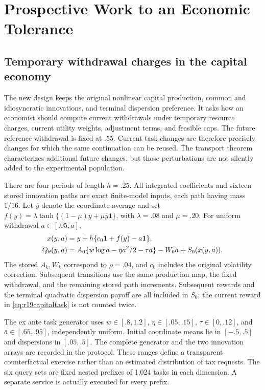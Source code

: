 \section{Prospective Work to an Economic Tolerance}\label{sec:r19experiment}
\subsection{Temporary withdrawal charges in the capital economy}
The new design keeps the original nonlinear capital production, common and
idiosyncratic innovations, and terminal dispersion preference. It asks how
an economist should compute current withdrawals under temporary resource
charges, current utility weights, adjustment terms, and feasible caps. The
future reference withdrawal is fixed at $.55$. Current task changes are
therefore precisely changes for which the same continuation can be reused.
The transport theorem characterizes additional future changes, but those
perturbations are not silently added to the experimental population.

There are four periods of length $h=.25$. All integrated coefficients and
sixteen stored innovation paths are exact finite-model inputs, each path
having mass $1/16$. Let $\overline y$ denote the coordinate average and set
$f(y)=\lambda\tanh\{(1-\mu)y+\mu\overline y\bm1\}$, with
$\lambda=.08$ and $\mu=.20$. For uniform withdrawal $a\in[.05,\bar a]$,
\begin{align}
 x(y,a)&=y+h\{c_0\bm1+f(y)-a\bm1\},\notag\\
 Q_\theta(y,a)&=A_0\{w\log a-\eta a^2/2-\tau a\}-W_0a
                    +S_0(x(y,a)).\label{eq:r19capitaltask}
\end{align}
The stored $A_k,W_k$ correspond to $\rho=.04$, and $c_0$ includes the
original volatility correction. Subsequent transitions use the same
production map, the fixed withdrawal, and the remaining stored path
increments. Subsequent rewards and the terminal quadratic dispersion payoff
are all included in $S_0$; the current reward in
\eqref{eq:r19capitaltask} is not counted twice.

The ex ante task generator uses $w\in[.8,1.2]$, $\eta\in[.05,.15]$,
$\tau\in[0,.12]$, and $\bar a\in[.65,.95]$, independently uniform.
Initial coordinate means lie in $[-.5,.5]$ and dispersions in $[.05,.5]$.
The complete generator and the two innovation arrays are recorded in the
protocol. These ranges define a transparent counterfactual exercise rather
than an estimated distribution of tax requests. The six query sets are
fixed nested prefixes of 1,024 tasks in each dimension. A separate service
is actually executed for every prefix.

